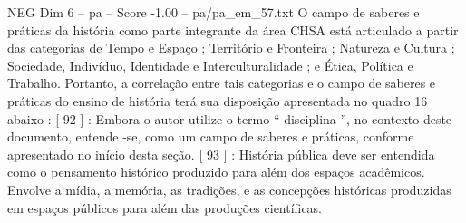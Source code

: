 \begin{textsample}{NEG Dim 6 – pa – Score -1.00 – pa/pa\_em\_57.txt}
O campo de saberes e práticas da história como parte integrante da área CHSA está articulado a partir das categorias de Tempo e Espaço ; Território e Fronteira ; Natureza e Cultura ; Sociedade, Indivíduo, Identidade e Interculturalidade ; e Ética, Política e Trabalho.
Portanto, a correlação entre tais categorias e o campo de saberes e práticas do ensino de história terá sua disposição apresentada no quadro 16 abaixo : [ 92 ] : Embora o autor utilize o termo “ disciplina ”, no contexto deste documento, entende -se, como um campo de saberes e práticas, conforme apresentado no início desta seção. [ 93 ] : História pública deve ser entendida como o pensamento histórico produzido para além dos espaços acadêmicos.
Envolve a mídia, a memória, as tradições, e as concepções históricas produzidas em espaços públicos para além das produções científicas.

\end{textsample}
